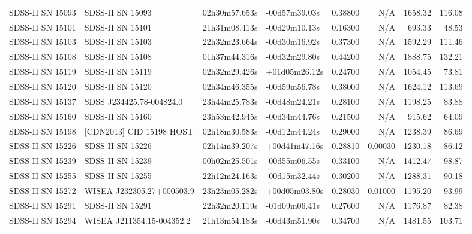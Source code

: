 \begin{longtable}{llllrrrr}
SDSS-II SN 15093 &                SDSS-II SN 15093 &   02h30m57.653s &   -00d57m39.03s &  0.38800 &      N/A &  1658.32 &      116.08 \\
SDSS-II SN 15101 &                SDSS-II SN 15101 &   21h31m08.413s &   -00d29m10.13s &  0.16300 &      N/A &   693.33 &       48.53 \\
SDSS-II SN 15103 &                SDSS-II SN 15103 &   22h32m23.664s &   -00d30m16.92s &  0.37300 &      N/A &  1592.29 &      111.46 \\
SDSS-II SN 15108 &                SDSS-II SN 15108 &   01h37m44.316s &   -00d32m29.80s &  0.44200 &      N/A &  1888.75 &      132.21 \\
SDSS-II SN 15119 &                SDSS-II SN 15119 &   02h32m29.426s &   +01d05m26.12s &  0.24700 &      N/A &  1054.45 &       73.81 \\
SDSS-II SN 15120 &                SDSS-II SN 15120 &   02h34m46.355s &   -00d59m56.78s &  0.38000 &      N/A &  1624.12 &      113.69 \\
SDSS-II SN 15137 &        SDSS J234425.78-004824.0 &   23h44m25.783s &   -00d48m24.21s &  0.28100 &      N/A &  1198.25 &       83.88 \\
SDSS-II SN 15160 &                SDSS-II SN 15160 &   23h53m42.945s &   -00d34m44.76s &  0.21500 &      N/A &   915.62 &       64.09 \\
SDSS-II SN 15198 &        [CDN2013] CID 15198 HOST &   02h18m30.583s &   -00d12m44.24s &  0.29000 &      N/A &  1238.39 &       86.69 \\
SDSS-II SN 15226 &                SDSS-II SN 15226 &   02h14m39.207s &   +00d41m47.16s &  0.28810 &  0.00030 &  1230.18 &       86.12 \\
SDSS-II SN 15239 &                SDSS-II SN 15239 &   00h02m25.501s &   -00d55m06.55s &  0.33100 &      N/A &  1412.47 &       98.87 \\
SDSS-II SN 15255 &                SDSS-II SN 15255 &   22h12m24.163s &   -00d15m32.44s &  0.30200 &      N/A &  1288.31 &       90.18 \\
SDSS-II SN 15272 &       WISEA J232305.27+000503.9 &   23h23m05.282s &   +00d05m03.80s &  0.28030 &  0.01000 &  1195.20 &       93.99 \\
SDSS-II SN 15291 &                SDSS-II SN 15291 &   22h32m20.119s &   -01d09m06.41s &  0.27600 &      N/A &  1176.87 &       82.38 \\
SDSS-II SN 15294 &       WISEA J211354.15-004352.2 &   21h13m54.183s &   -00d43m51.90s &  0.34700 &      N/A &  1481.55 &      103.71 \\

\end{longtable}
